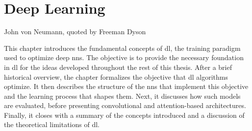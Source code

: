\chapter{Deep Learning}
\label{chap:deep_learning}

{John von Neumann, quoted by Freeman Dyson~\parencite{dyson2004meeting}}

\chaptercontents

\glsresetall

This chapter introduces the fundamental concepts of \gls{dl}, the training paradigm used to optimize deep \glspl{nn}.
The objective is to provide the necessary foundation in \gls{dl} for the ideas developed throughout the rest of this thesis.
After a brief historical overview, the chapter formalizes the objective that \gls{dl} algorithms optimize.
It then describes the structure of the \glspl{nn} that implement this objective and the learning process that shapes them.
Next, it discusses how such models are evaluated, before presenting convolutional and attention-based architectures.
Finally, it closes with a summary of the concepts introduced and a discussion of the theoretical limitations of \gls{dl}.







